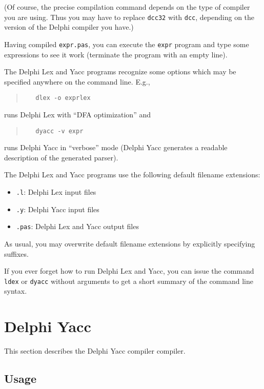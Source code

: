 \documentclass[a4paper]{article}
\begin{document}
(Of course, the precise compilation command depends on the type of compiler
you are using. Thus you may have to replace \verb"dcc32" with \verb"dcc", depending on the version of the Delphi compiler you have.)

Having compiled \verb"expr.pas", you can execute the \verb"expr" program and
type some expressions to see it work (terminate the program with an empty
line).

The Delphi Lex and Yacc programs recognize some options which may be specified
anywhere on the command line. E.g.,
\begin{quote}\begin{verbatim}
   dlex -o exprlex
\end{verbatim}\end{quote}
runs Delphi Lex with ``DFA optimization'' and
\begin{quote}\begin{verbatim}
   dyacc -v expr
\end{verbatim}\end{quote}
runs Delphi Yacc in ``verbose'' mode (Delphi Yacc generates a readable description
of the generated parser).

The Delphi Lex and Yacc programs use the following default filename extensions:
\begin{itemize}
   \item \verb".l": Delphi Lex input files
   \item \verb".y": Delphi Yacc input files
   \item \verb".pas": Delphi Lex and Yacc output files
\end{itemize}
As usual, you may overwrite default filename extensions by explicitly
specifying suffixes.

If you ever forget how to run Delphi Lex and Yacc, you can issue the command
\verb"ldex" or \verb"dyacc" without arguments to get a short 
summary of the command line syntax.

\newpage

\section{Delphi Yacc}

This section describes the Delphi Yacc compiler compiler.

\subsection{Usage}
\end{document}
